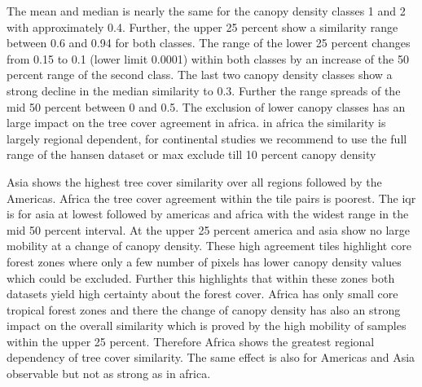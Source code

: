 			The mean and median is nearly the same for the canopy density classes 1 and 2 with approximately 0.4. Further, the upper 25 percent show a similarity range between 0.6 and 0.94 for both classes. The range of the lower 25 percent changes from 0.15 to 0.1 (lower limit 0.0001) within both classes by an increase of the 50 percent range of the second class. The last two canopy density classes show a strong decline in the median similarity to 0.3. Further the range spreads of the mid 50 percent between 0 and 0.5. The exclusion of lower canopy classes has an large impact on the tree cover agreement in africa. 
			in africa the similarity is largely regional dependent, for continental studies we recommend to use the full range of the hansen dataset or max exclude till 10 percent canopy density

			 Asia shows the highest tree cover similarity over all regions followed by the Americas. Africa the tree cover agreement within the tile pairs is poorest. The iqr is for asia at lowest followed by americas and africa with the widest range in the mid 50 percent interval. At the upper 25 percent america and asia show no large mobility at a change of canopy density. These high agreement tiles highlight core forest zones where only a few number of pixels has lower canopy density values which could be excluded. Further this highlights that within these zones both datasets yield high certainty about the forest cover. Africa has only small core tropical forest zones and there the change of canopy density has also an strong impact on the overall similarity which is proved by the high mobility of samples within the upper 25 percent. Therefore Africa shows the greatest regional dependency of tree cover similarity. The same effect is also for Americas and Asia observable but not as strong as in africa. 

